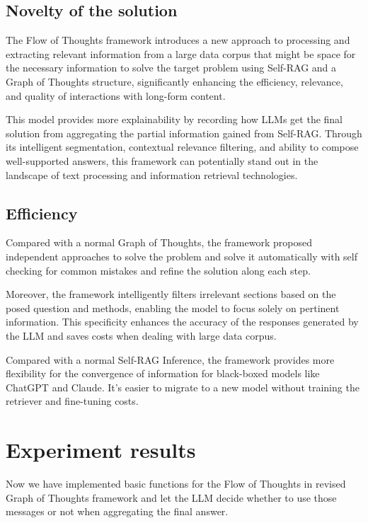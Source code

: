 \documentclass{article}
\begin{document}
\subsection{Novelty of the solution}

The Flow of Thoughts framework introduces a new approach to processing and extracting relevant information from a large data corpus that might be space for the necessary information to solve the target problem using Self-RAG and a Graph of Thoughts structure, significantly enhancing the efficiency, relevance, and quality of interactions with long-form content. 

This model provides more explainability by recording how LLMs get the final solution from aggregating the partial information gained from Self-RAG. Through its intelligent segmentation, contextual relevance filtering, and ability to compose well-supported answers, this framework can potentially stand out in the landscape of text processing and information retrieval technologies.

\subsection{Efficiency}

Compared with a normal Graph of Thoughts, the framework proposed independent approaches to solve the problem and solve it automatically with self checking for common mistakes and refine the solution along each step.

Moreover, the framework intelligently filters irrelevant sections based on the posed question and methods, enabling the model to focus solely on pertinent information. This specificity enhances the accuracy of the responses generated by the LLM and saves costs when dealing with large data corpus.

Compared with a normal Self-RAG Inference, the framework provides more flexibility for the convergence of information for black-boxed models like ChatGPT and Claude. It's easier to migrate to a new model without training the retriever and fine-tuning costs.

\section{Experiment results}

Now we have implemented basic functions for the Flow of Thoughts in revised Graph of Thoughts framework and let the LLM decide whether to use those messages or not when aggregating the final answer.
\end{document}

